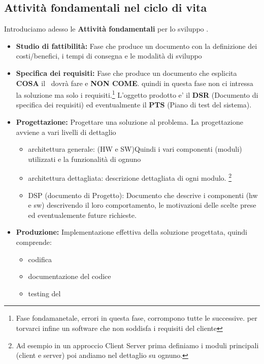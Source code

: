 \subsection{Attivit\`a fondamentali nel ciclo di vita}
Introduciamo adesso le \textbf{Attivit\`a fondamentali} per lo sviluppo \sw .
\begin{itemize}
    \item \textbf{Studio di fattibilit\`a: }
        Fase che produce un documento con la definizione dei costi/benefici, i tempi di consegna e le modalit\`a di sviluppo
    \item \textbf{Specifica dei requisiti: }
        Fase che produce un documento che esplicita \textbf{COSA} il \sw\ dovr\`a fare e \textbf{NON COME}.
        quindi in questa fase non ci intressa la soluzione ma solo i requisiti.\footnote{Fase fondamanetale, errori in questa fase, corrompono tutte le successive. per torvarci infine un software che non soddisfa i requisiti del cliente}
        L'oggetto prodotto e' il \textbf{DSR} (Documento di specifica dei requisiti) ed eventualmente il \textbf{PTS} (Piano di test del sistema).
    \item \textbf{Progettazione: }
        Progettare una soluzione al problema. La progettazione avviene a vari livelli di dettaglio
        \begin{itemize}
            \item architettura generale: 
                (HW e SW)Quindi i vari componenti (moduli) utilizzati e la funzionalit\`a di ognuno
            \item architettura dettagliata: 
                descrizione dettagliata di ogni modulo.
                \footnote{Ad esempio in un approccio Client Server prima definiamo i moduli principali (client e server) poi andiamo nel dettaglio su ognuno.}
            \item DSP (documento di Progetto): 
                Documento che descrive i componenti (hw e sw) descrivendo il loro comportamento, le motivazioni delle scelte prese ed eventualemente future richieste.
        \end{itemize}
    \item \textbf{Produzione: }
        Implementazione effettiva della soluzione progettata, quindi comprende:
        \begin{itemize}
            \item codifica
            \item documentazione del codice
            \item testing del \sw

\end{itemize}
\end{itemize}
